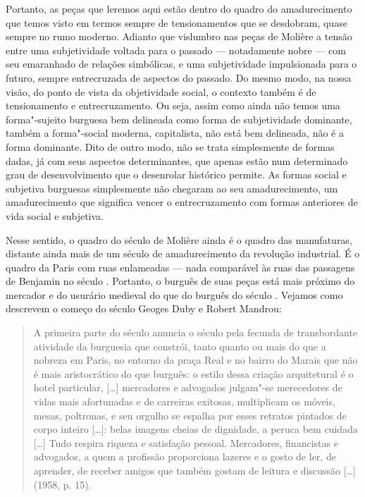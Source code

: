 Portanto, as peças que leremos aqui estão dentro do quadro do
amadurecimento que temos visto em termos sempre de tensionamentos que se
desdobram, quase sempre no rumo moderno. Adianto que vislumbro nas peças de
Molière a tensão entre uma subjetividade voltada para o
passado --- notadamente nobre --- com seu emaranhado de relações
simbólicas, e uma subjetividade impulsionada para o futuro, sempre
entrecruzada de aspectos do passado. Do mesmo modo, na nossa visão, do
ponto de vista da objetividade social, o contexto também é de
tensionamento e entrecruzamento. Ou seja, assim como ainda não temos uma
forma"-sujeito burguesa bem delineada como forma de subjetividade
dominante, também a forma"-social moderna, capitalista, não está bem
delineada, não é a forma dominante. Dito de outro modo, não se trata
simplesmente de formas dadas, já com seus aspectos determinantes, que
apenas estão num determinado grau de desenvolvimento que o desenrolar
histórico permite. As formas social e subjetiva burguesas simplesmente
não chegaram ao seu amadurecimento, um amadurecimento que significa
vencer o entrecruzamento com formas anteriores de vida social e
subjetiva.

Nesse sentido, o quadro do século  de Molière ainda é o quadro das
manufaturas, distante ainda mais de um século de amadurecimento da
revolução industrial. É o quadro da Paris com ruas enlameadas --- nada
comparável às ruas das passagens de Benjamin no século . Portanto, o
burguês de suas peças está mais próximo do mercador e do usurário
medieval do que do burguês do século . Vejamos como descrevem o
começo do século  Geoges Duby e Robert Mandrou:

\begin{quote}
A primeira parte do século  anuncia o século  pela fecunda de
transbordante atividade da burguesia que constrói, tanto quanto ou mais
do que a nobreza em Paris, no entorno da praça Real e no bairro do
Marais que não é mais aristocrático do que burguês: o estilo dessa
criação arquitetural é o hotel particular, [\ldots{}] mercadores e
advogados julgam"-se merecedores de vidas mais afortunadas e de carreiras
exitosas, multiplicam os móveis, mesas, poltronas, e seu orgulho se
espalha por esses retratos pintados de corpo inteiro [\ldots{}]:
belas imagens cheias de dignidade, a peruca bem cuidada [\ldots{}]
Tudo respira riqueza e satisfação pessoal. Mercadores, financistas e
advogados, a quem a profissão proporciona lazeres e o gosto de ler, de
aprender, de receber amigos que também gostam de leitura e discussão
[\ldots{}] (1958, p. 15).
\end{quote}

